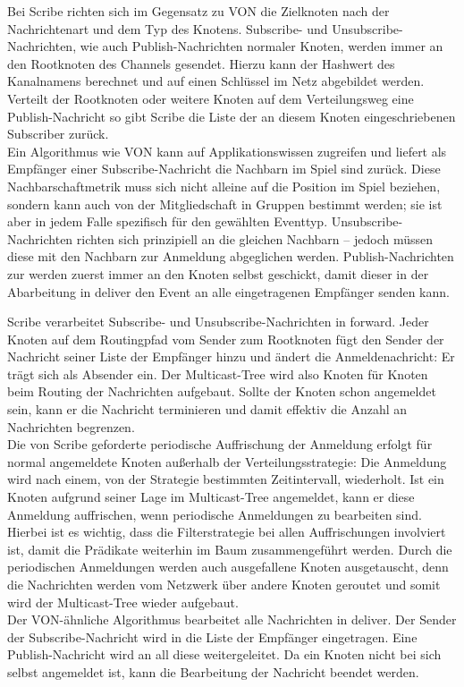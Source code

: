 Bei Scribe richten sich im Gegensatz zu VON die Zielknoten nach der Nachrichtenart und dem Typ des Knotens. Subscribe- und Unsubscribe-Nachrichten, wie auch Publish-Nachrichten normaler Knoten, werden immer an den Rootknoten des Channels gesendet. Hierzu kann der Hashwert des Kanalnamens berechnet und auf einen Schlüssel im Netz abgebildet werden. Verteilt der Rootknoten oder weitere Knoten auf dem Verteilungsweg eine Publish-Nachricht so gibt Scribe die Liste der an diesem Knoten eingeschriebenen Subscriber zurück.\\
Ein Algorithmus wie VON kann auf Applikationswissen zugreifen und liefert als Empfänger einer Subscribe-Nachricht die Nachbarn im Spiel sind zurück. Diese Nachbarschaftmetrik muss sich nicht alleine auf die Position im Spiel beziehen, sondern kann auch von der Mitgliedschaft in Gruppen bestimmt werden; sie ist aber in jedem Falle spezifisch für den gewählten Eventtyp. Unsubscribe-Nachrichten richten sich prinzipiell an die gleichen Nachbarn -- jedoch müssen diese mit den Nachbarn zur Anmeldung abgeglichen werden. Publish-Nachrichten zur werden zuerst immer an den Knoten selbst geschickt, damit dieser in der Abarbeitung in deliver den Event an alle eingetragenen Empfänger senden kann.

Scribe verarbeitet Subscribe- und Unsubscribe-Nachrichten in forward. Jeder Knoten auf dem Routingpfad vom Sender zum Rootknoten fügt den Sender der Nachricht seiner Liste der Empfänger hinzu und ändert die Anmeldenachricht: Er trägt sich als Absender ein. Der Multicast-Tree wird also Knoten für Knoten beim Routing der Nachrichten aufgebaut. Sollte der Knoten schon angemeldet sein, kann er die Nachricht terminieren und damit effektiv die Anzahl an Nachrichten begrenzen.\\
Die von Scribe geforderte periodische Auffrischung der Anmeldung erfolgt für normal angemeldete Knoten außerhalb der Verteilungsstrategie: Die Anmeldung wird nach einem, von der Strategie bestimmten Zeitintervall, wiederholt. Ist ein Knoten aufgrund seiner Lage im Multicast-Tree angemeldet, kann er diese Anmeldung auffrischen, wenn periodische Anmeldungen zu bearbeiten sind. Hierbei ist es wichtig, dass die Filterstrategie bei allen Auffrischungen involviert ist, damit die Prädikate weiterhin im Baum zusammengeführt werden. Durch die periodischen Anmeldungen werden auch ausgefallene Knoten ausgetauscht, denn die Nachrichten werden vom Netzwerk über andere Knoten geroutet und somit wird der Multicast-Tree wieder aufgebaut.\\
Der VON-ähnliche Algorithmus bearbeitet alle Nachrichten in deliver. Der Sender der Subscribe-Nachricht wird in die Liste der Empfänger eingetragen. Eine Publish-Nachricht wird an all diese weitergeleitet. Da ein Knoten nicht bei sich selbst angemeldet ist, kann die Bearbeitung der Nachricht beendet werden.

